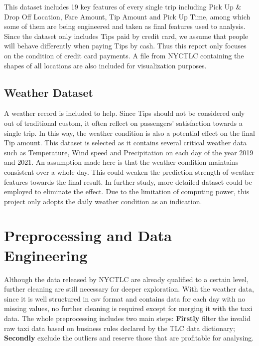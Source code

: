 \documentclass[11pt]{article}
\begin{document}
This dataset includes 19 key features of every single trip including Pick Up \& Drop Off Location, Fare Amount, Tip Amount and Pick Up Time, among which some of them are being engineered and taken as final features used to analysis. Since the dataset only includes Tips paid by credit card, we assume that people will behave differently when paying Tips by cash. Thus this report only focuses on the condition of credit card payments.
A file from NYCTLC containing the shapes of all locations are also included for visualization purposes.

\subsection{Weather Dataset}
A weather record\cite{4} is included to help. Since Tips should not be considered only out of traditional custom, it often reflect on passengers' satisfaction towards a single trip. In this way, the weather condition is also a potential effect on the final Tip amount. This dataset is selected as it contains several critical weather data such as Temperature, Wind speed and Precipitation on each day of the year 2019 and 2021. An assumption made here is that the weather condition maintains consistent over a whole day. This could weaken the prediction strength of weather features towards the final result. In further study, more detailed dataset could be employed to eliminate the effect. Due to the limitation of computing power, this project only adopts the daily weather condition as an indication.



\section{Preprocessing and Data Engineering}
Although the data released by NYCTLC are already qualified to a certain level, further cleaning are still necessary for deeper exploration. With the weather data, since it is well structured in csv format and contains data for each day with no missing values, no further cleaning is required except for merging it with the taxi data. The whole preprocessing includes two main steps: \textbf{Firstly} filter the invalid raw taxi data based on business rules declared by the TLC data dictionary; \textbf{Secondly} exclude the outliers and reserve those that are profitable for analysing.\\
\end{document}
